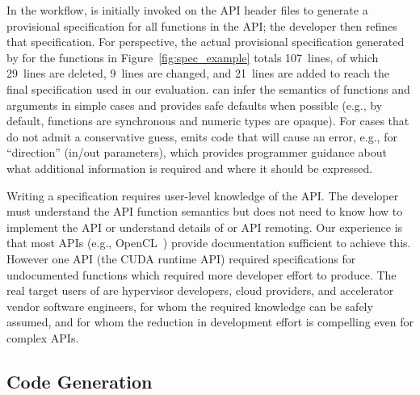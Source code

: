 {

In the \model workflow, \compiler is initially invoked on the API header files to generate a provisional \speclang specification for all functions in the API;
the developer then refines that specification.
For perspective,
the actual provisional specification generated by \compiler for the functions in Figure~\ref{fig:spec_example} totals 107~lines,
of which 29~lines are deleted, 9~lines are changed, and 21~lines are added to reach the final specification used in our evaluation.
\Compiler can infer the semantics of functions and arguments in simple cases and provides safe defaults when possible (e.g., by default, functions are synchronous and numeric types are opaque).
For cases that do not admit a conservative guess, \compiler emits code that will cause an error, e.g., for ``direction'' (in/out parameters),
which provides programmer guidance about what additional information is required and where it should be expressed.

Writing a \speclang specification requires user-level knowledge of the API.
The developer must understand the API function semantics but does not need to know how to implement the API or understand details of \model or API remoting.
Our experience is that most APIs (e.g., OpenCL~\cite{opencl}) provide documentation sufficient to achieve this.
However one API (the CUDA runtime API)
required \speclang specifications for undocumented functions which required more developer effort to produce. The real target users of \model
are hypervisor developers, cloud providers, and accelerator vendor software engineers, for whom the required knowledge can be safely assumed, and for whom
the reduction in development effort is compelling even for complex APIs.

\subsection{Code Generation}
\label{s:code_gen}


}
